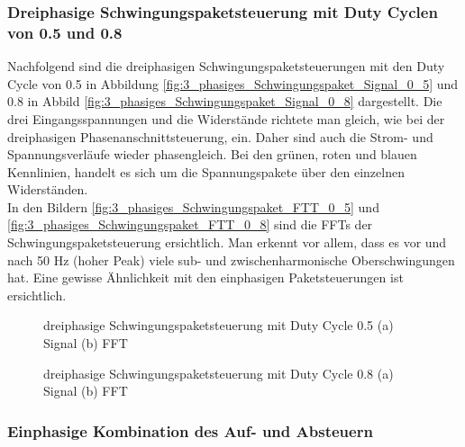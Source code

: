 \newpage

\subsubsection{Dreiphasige Schwingungspaketsteuerung mit Duty Cyclen von 0.5 und 0.8}\label{sec:Schwingungspaketsteuerung_Simulation}
Nachfolgend sind die dreiphasigen Schwingungspaketsteuerungen mit den Duty Cycle von 0.5 in Abbildung \ref{fig:3_phasiges_Schwingungspaket_Signal_0_5} und 0.8 in Abbild \ref{fig:3_phasiges_Schwingungspaket_Signal_0_8} dargestellt. Die drei Eingangsspannungen und die Widerstände richtete man gleich, wie bei der dreiphasigen Phasenanschnittsteuerung, ein. Daher sind auch die Strom- und Spannungsverläufe wieder phasengleich. Bei den grünen, roten und blauen Kennlinien, handelt es sich um die Spannungspakete über den einzelnen Widerständen.\\
In den Bildern \ref{fig:3_phasiges_Schwingungspaket_FTT_0_5} und \ref{fig:3_phasiges_Schwingungspaket_FTT_0_8} sind die FFTs der Schwingungspaketsteuerung ersichtlich. Man erkennt vor allem, dass es vor und nach 50 Hz (hoher Peak) viele sub- und zwischenharmonische Oberschwingungen hat. Eine gewisse Ähnlichkeit mit den einphasigen Paketsteuerungen ist ersichtlich.
 

\begin{figure}[ht!]
	\centering
	\qquad
	\caption{dreiphasige Schwingungspaketsteuerung mit Duty Cycle 0.5 (a) Signal (b) FFT}
	\label{fig:3_phasiges_Schwingungspaket_0_5}
\end{figure}



\begin{figure}[ht!]
	\centering
	\qquad
	\caption{dreiphasige Schwingungspaketsteuerung mit Duty Cycle 0.8 (a) Signal (b) FFT}
	\label{fig:3_phasiges_Schwingungspaket_0_8}
\end{figure}

\newpage
\subsubsection{Einphasige Kombination des Auf- und Absteuern}

